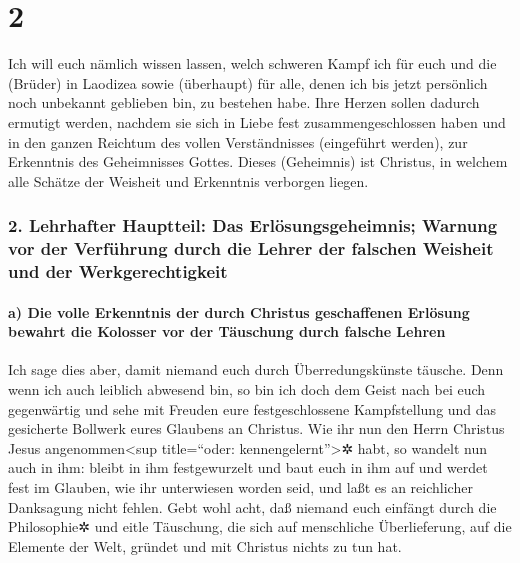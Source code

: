 \hypertarget{section-1}{%
\section{2}\label{section-1}}

 Ich will euch nämlich wissen lassen, welch schweren Kampf
ich für euch und die (Brüder) in Laodizea sowie (überhaupt) für alle,
denen ich bis jetzt persönlich noch unbekannt geblieben bin, zu bestehen
habe.  Ihre Herzen sollen dadurch ermutigt werden, nachdem
sie sich in Liebe fest zusammengeschlossen haben und in den ganzen
Reichtum des vollen Verständnisses (eingeführt werden), zur Erkenntnis
des Geheimnisses Gottes.  Dieses (Geheimnis) ist Christus,
in welchem alle Schätze der Weisheit und Erkenntnis verborgen liegen.

\hypertarget{lehrhafter-hauptteil-das-erluxf6sungsgeheimnis-warnung-vor-der-verfuxfchrung-durch-die-lehrer-der-falschen-weisheit-und-der-werkgerechtigkeit}{%
\subsubsection{2. Lehrhafter Hauptteil: Das Erlösungsgeheimnis; Warnung
vor der Verführung durch die Lehrer der falschen Weisheit und der
Werkgerechtigkeit}\label{lehrhafter-hauptteil-das-erluxf6sungsgeheimnis-warnung-vor-der-verfuxfchrung-durch-die-lehrer-der-falschen-weisheit-und-der-werkgerechtigkeit}}

\hypertarget{a-die-volle-erkenntnis-der-durch-christus-geschaffenen-erluxf6sung-bewahrt-die-kolosser-vor-der-tuxe4uschung-durch-falsche-lehren}{%
\paragraph{a) Die volle Erkenntnis der durch Christus geschaffenen
Erlösung bewahrt die Kolosser vor der Täuschung durch falsche
Lehren}\label{a-die-volle-erkenntnis-der-durch-christus-geschaffenen-erluxf6sung-bewahrt-die-kolosser-vor-der-tuxe4uschung-durch-falsche-lehren}}

 Ich sage dies aber, damit niemand euch durch
Überredungskünste täusche.  Denn wenn ich auch leiblich
abwesend bin, so bin ich doch dem Geist nach bei euch gegenwärtig und
sehe mit Freuden eure festgeschlossene Kampfstellung und das gesicherte
Bollwerk eures Glaubens an Christus.  Wie ihr nun den
Herrn Christus Jesus angenommen\textless sup title=``oder:
kennengelernt''\textgreater✲ habt, so wandelt nun auch in ihm:
 bleibt in ihm festgewurzelt und baut euch in ihm auf und
werdet fest im Glauben, wie ihr unterwiesen worden seid, und laßt es an
reichlicher Danksagung nicht fehlen.  Gebt wohl acht, daß
niemand euch einfängt durch die Philosophie✲ und eitle Täuschung, die
sich auf menschliche Überlieferung, auf die Elemente der Welt, gründet
und mit Christus nichts zu tun hat.

